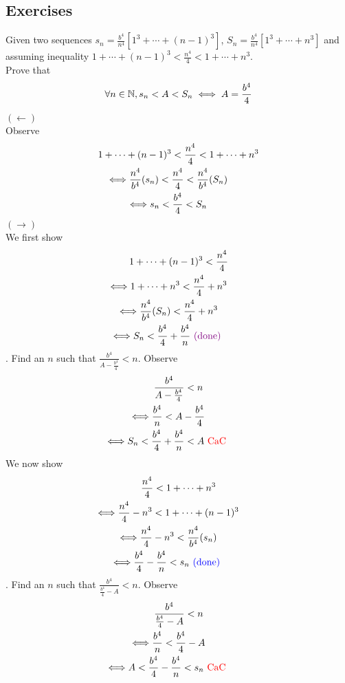 \documentclass{report}
\begin{document}
\subsection{Exercises}
\begin{question}{}{}
Given two sequences $s_n=\frac{b^4}{n^4}[1^3+\cdots +(n-1)^3]$, $S_n=\frac{b^4}{n^4}[1^3+\cdots+ n^3]$ and assuming inequality $1+\cdots +(n-1)^3<\frac{n^4}{4}<1+\cdots +n^3$.\\

Prove that
\begin{equation}
\forall n\in \mathbb{N},s_n<A<S_n \iff A=\frac{b^4}{4}
\end{equation}
\end{question}

\begin{solution}
$(\longleftarrow)$\\

Observe
\begin{gather}
1+\cdots +(n-1)^3<\frac{n^4}{4}<1+\cdots +n^3 \\
\liff \frac{n^4}{b^4}(s_n)<\frac{n^4}{4}<\frac{n^4}{b^4}(S_n) \\
\liff s_n<\frac{b^4}{4}<S_n
\end{gather}
$(\longrightarrow)$\\

We first show  
\begin{gather}
1+\cdots +(n-1)^3<\frac{n^4}{4}\\
\liff 1+\cdots +n^3<\frac{n^4}{4}+n^3\\
\liff \frac{n^4}{b^4}(S_n)<\frac{n^4}{4}+n^3\\
\liff S_n<\frac{b^4}{4}+\frac{b^4}{n} \text{ \vi{(done)} }
\end{gather}
. Find an $n$ such that $\frac{b^4}{A-\frac{b^4}{4}}<n$. Observe
\begin{gather}
\frac{b^4}{A-\frac{b^4}{4}}<n\\
\liff \frac{b^4}{n}<A-\frac{b^4}{4} \\
\liff S_n<\frac{b^4}{4}+\frac{b^4}{n}<A \text{ \CaC }
\end{gather}
We now show  
\begin{gather}
\frac{n^4}{4}<1+\cdots +n^3\\
\liff \frac{n^4}{4}-n^3<1+\cdots +(n-1)^3\\
\liff \frac{n^4}{4}-n^3<\frac{n^4}{b^4}(s_n)\\
\liff \frac{b^4}{4}-\frac{b^4}{n}<s_n \blue{\text{ (done) }} 
\end{gather}
. Find an $n$ such that $\frac{b^4}{\frac{b^4}{4}-A}<n$. Observe
\begin{gather}
\frac{b^4}{\frac{b^4}{4}-A}<n\\
\liff \frac{b^4}{n}<\frac{b^4}{4}-A\\
\liff A<\frac{b^4}{4}-\frac{b^4}{n}<s_n \text{ \CaC }
\end{gather}
\end{solution}
\end{document}
